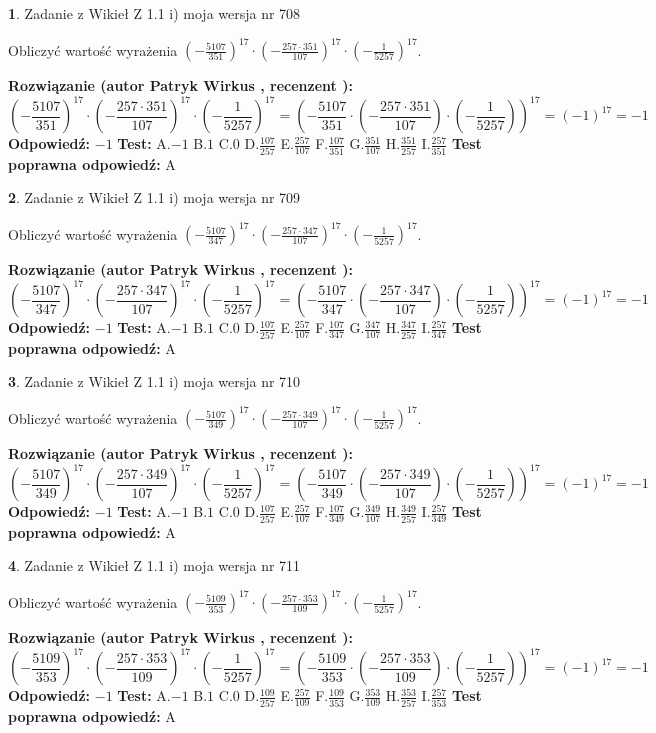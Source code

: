 \documentclass[12pt, a4paper]{article}
\theoremstyle{definition} %
\newtheorem{zad}{}
\newcommand{\zadStart}[1]{\begin{zad}#1\newline}
\newcommand{\zadStop}{\end{zad}}
\newcommand{\rozwStart}[2]{\noindent \textbf{Rozwiązanie (autor #1 , recenzent #2): }\newline}
\newcommand{\rozwStop}{\newline}
\newcommand{\odpStart}{\noindent \textbf{Odpowiedź:}\newline}
\newcommand{\odpStop}{\newline}
\newcommand{\testStart}{\noindent \textbf{Test:}\newline}
\newcommand{\testStop}{\newline}
\newcommand{\kluczStart}{\noindent \textbf{Test poprawna odpowiedź:}\newline}
\newcommand{\kluczStop}{\newline}
\begin{document}
\zadStart{Zadanie z Wikieł Z 1.1 i) moja wersja nr 708}

Obliczyć wartość wyrażenia $(-\frac{5107}{351})^{17} \cdot (-\frac{257 \cdot 351}{107})^{17} \cdot (-\frac{1}{5257})^{17}$.
\zadStop
\rozwStart{Patryk Wirkus}{}
$$(-\frac{5107}{351})^{17} \cdot (-\frac{257 \cdot 351}{107})^{17} \cdot (-\frac{1}{5257})^{17} = (-\frac{5107}{351} \cdot (-\frac{257 \cdot 351}{107}) \cdot (-\frac{1}{5257}))^{17} = (-1)^{17} = -1$$
\rozwStop
\odpStart
$-1$
\odpStop
\testStart
A.$-1$ B.$1$ C.$0$ D.$\frac{107}{257}$ E.$\frac{257}{107}$
F.$\frac{107}{351}$ G.$\frac{351}{107}$
H.$\frac{351}{257}$
I.$\frac{257}{351}$
\testStop
\kluczStart
A
\kluczStop



\zadStart{Zadanie z Wikieł Z 1.1 i) moja wersja nr 709}

Obliczyć wartość wyrażenia $(-\frac{5107}{347})^{17} \cdot (-\frac{257 \cdot 347}{107})^{17} \cdot (-\frac{1}{5257})^{17}$.
\zadStop
\rozwStart{Patryk Wirkus}{}
$$(-\frac{5107}{347})^{17} \cdot (-\frac{257 \cdot 347}{107})^{17} \cdot (-\frac{1}{5257})^{17} = (-\frac{5107}{347} \cdot (-\frac{257 \cdot 347}{107}) \cdot (-\frac{1}{5257}))^{17} = (-1)^{17} = -1$$
\rozwStop
\odpStart
$-1$
\odpStop
\testStart
A.$-1$ B.$1$ C.$0$ D.$\frac{107}{257}$ E.$\frac{257}{107}$
F.$\frac{107}{347}$ G.$\frac{347}{107}$
H.$\frac{347}{257}$
I.$\frac{257}{347}$
\testStop
\kluczStart
A
\kluczStop



\zadStart{Zadanie z Wikieł Z 1.1 i) moja wersja nr 710}

Obliczyć wartość wyrażenia $(-\frac{5107}{349})^{17} \cdot (-\frac{257 \cdot 349}{107})^{17} \cdot (-\frac{1}{5257})^{17}$.
\zadStop
\rozwStart{Patryk Wirkus}{}
$$(-\frac{5107}{349})^{17} \cdot (-\frac{257 \cdot 349}{107})^{17} \cdot (-\frac{1}{5257})^{17} = (-\frac{5107}{349} \cdot (-\frac{257 \cdot 349}{107}) \cdot (-\frac{1}{5257}))^{17} = (-1)^{17} = -1$$
\rozwStop
\odpStart
$-1$
\odpStop
\testStart
A.$-1$ B.$1$ C.$0$ D.$\frac{107}{257}$ E.$\frac{257}{107}$
F.$\frac{107}{349}$ G.$\frac{349}{107}$
H.$\frac{349}{257}$
I.$\frac{257}{349}$
\testStop
\kluczStart
A
\kluczStop



\zadStart{Zadanie z Wikieł Z 1.1 i) moja wersja nr 711}

Obliczyć wartość wyrażenia $(-\frac{5109}{353})^{17} \cdot (-\frac{257 \cdot 353}{109})^{17} \cdot (-\frac{1}{5257})^{17}$.
\zadStop
\rozwStart{Patryk Wirkus}{}
$$(-\frac{5109}{353})^{17} \cdot (-\frac{257 \cdot 353}{109})^{17} \cdot (-\frac{1}{5257})^{17} = (-\frac{5109}{353} \cdot (-\frac{257 \cdot 353}{109}) \cdot (-\frac{1}{5257}))^{17} = (-1)^{17} = -1$$
\rozwStop
\odpStart
$-1$
\odpStop
\testStart
A.$-1$ B.$1$ C.$0$ D.$\frac{109}{257}$ E.$\frac{257}{109}$
F.$\frac{109}{353}$ G.$\frac{353}{109}$
H.$\frac{353}{257}$
I.$\frac{257}{353}$
\testStop
\kluczStart
A
\kluczStop
\end{document}
